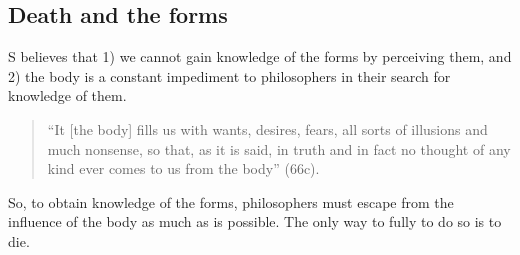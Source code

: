 \documentclass[oneside]{article}
\begin{document}
\subsection*{Death and the forms}
S believes that 1) we cannot gain knowledge of the forms by perceiving them, and 2) the body is a constant impediment to philosophers in their search for knowledge of them. 
\begin{quote}
``It [the body] fills us with wants, desires, fears, all sorts of illusions and much nonsense, so that, as it is said, in truth and in fact no thought of any kind ever comes to us from the body'' (66c). 
\end{quote} 
So, to obtain knowledge of the forms, philosophers must escape from the influence of the
body as much as is possible. The only way to fully to do so is to die. 
\end{document}
